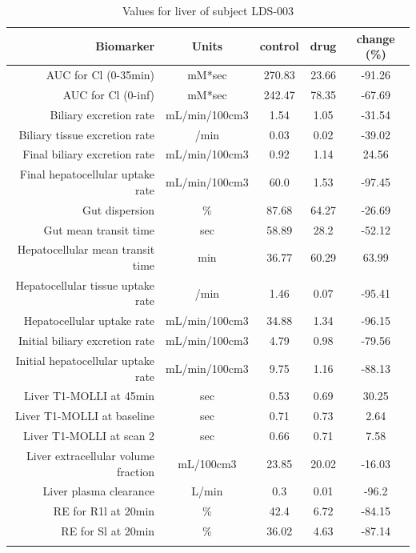 \documentclass{epflreport}%
\begin{document}
%
\clearpage%
\begin{longtable}{rcccc}%
\hline%
Biomarker&Units&control&drug&change (\%)\\%
\hline%
AUC for Cl (0{-}35min)&mM*sec&270.83&23.66&{-}91.26\\%
AUC for Cl (0{-}inf)&mM*sec&242.47&78.35&{-}67.69\\%
Biliary excretion rate&mL/min/100cm3&1.54&1.05&{-}31.54\\%
Biliary tissue excretion rate&/min&0.03&0.02&{-}39.02\\%
Final biliary excretion rate&mL/min/100cm3&0.92&1.14&24.56\\%
Final hepatocellular uptake rate&mL/min/100cm3&60.0&1.53&{-}97.45\\%
Gut dispersion&\%&87.68&64.27&{-}26.69\\%
Gut mean transit time&sec&58.89&28.2&{-}52.12\\%
Hepatocellular mean transit time&min&36.77&60.29&63.99\\%
Hepatocellular tissue uptake rate&/min&1.46&0.07&{-}95.41\\%
Hepatocellular uptake rate&mL/min/100cm3&34.88&1.34&{-}96.15\\%
Initial biliary excretion rate&mL/min/100cm3&4.79&0.98&{-}79.56\\%
Initial hepatocellular uptake rate&mL/min/100cm3&9.75&1.16&{-}88.13\\%
Liver T1{-}MOLLI at 45min&sec&0.53&0.69&30.25\\%
Liver T1{-}MOLLI at baseline&sec&0.71&0.73&2.64\\%
Liver T1{-}MOLLI at scan 2&sec&0.66&0.71&7.58\\%
Liver extracellular volume fraction&mL/100cm3&23.85&20.02&{-}16.03\\%
Liver plasma clearance&L/min&0.3&0.01&{-}96.2\\%
RE for R1l at 20min&\%&42.4&6.72&{-}84.15\\%
RE for Sl at 20min&\%&36.02&4.63&{-}87.14\\%
\hline%
\caption{Values for liver of subject LDS-003} \\%
\end{longtable}%
\end{document}
